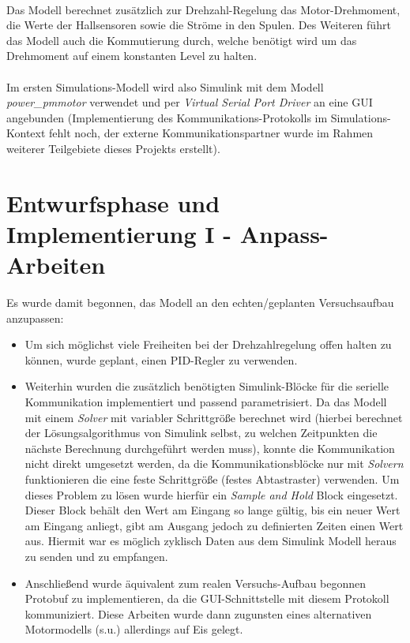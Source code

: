 \paragraph{}
Das Modell berechnet zusätzlich zur Drehzahl-Regelung das Motor-Drehmoment, die Werte der Hallsensoren sowie die Ströme in den Spulen. Des Weiteren führt das Modell auch die Kommutierung durch, welche benötigt wird um das Drehmoment auf einem konstanten Level zu halten.

\paragraph{}
Im ersten Simulations-Modell wird also Simulink mit dem Modell \textit{power\_pmmotor} verwendet und per \textit{Virtual Serial Port Driver} an eine GUI angebunden (Implementierung des Kommunikations-Protokolls im Simulations-Kontext fehlt noch, der externe Kommunikationspartner wurde im Rahmen weiterer Teilgebiete dieses Projekts erstellt).

\section{Entwurfsphase und Implementierung I - Anpass-Arbeiten}
Es wurde damit begonnen, das Modell an den echten/geplanten Versuchsaufbau anzupassen:  
\begin{itemize}
	\item Um sich möglichst viele Freiheiten bei der Drehzahlregelung offen halten zu können, wurde geplant, einen PID-Regler zu verwenden. 
	\item Weiterhin wurden die zusätzlich benötigten Simulink-Blöcke für die serielle Kommunikation implementiert und passend parametrisiert. Da das Modell mit einem \textit{Solver} mit variabler Schrittgröße berechnet wird (hierbei berechnet der Lösungsalgorithmus von Simulink selbst, zu welchen Zeitpunkten die nächste Berechnung durchgeführt werden muss), konnte die Kommunikation nicht direkt umgesetzt werden, da die Kommunikationsblöcke nur mit \textit{Solvern} funktionieren die eine feste Schrittgröße (festes Abtastraster) verwenden. 
	Um dieses Problem zu lösen wurde hierfür ein \textit{Sample and Hold} Block eingesetzt. Dieser Block behält den Wert am Eingang so lange gültig, bis ein neuer Wert am Eingang anliegt, gibt am Ausgang jedoch zu definierten Zeiten einen Wert aus. Hiermit war es möglich zyklisch Daten aus dem Simulink Modell heraus zu senden und zu empfangen.
	\item Anschließend wurde äquivalent zum realen Versuchs-Aufbau begonnen Protobuf zu implementieren, da die GUI-Schnittstelle mit diesem Protokoll kommuniziert. Diese Arbeiten wurde dann zugunsten eines alternativen Motormodells (s.u.) allerdings auf Eis gelegt.
\end{itemize}

